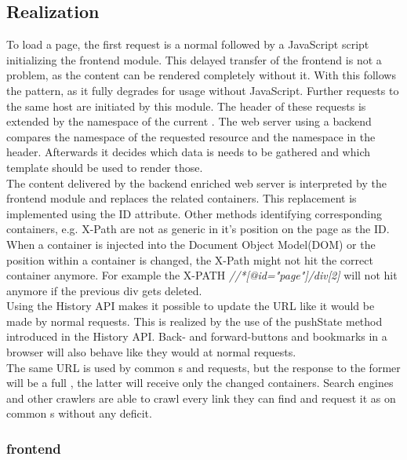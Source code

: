 \subsection{Realization\label{sec:lare_realization}}
To load a page, the first request is a normal \httpRequest{} followed by a JavaScript script initializing the \lare{} frontend module.
This delayed transfer of the frontend is not a problem, as the content can be rendered completely without it.
With this \lare{} follows the \hijax{} pattern, as it fully degrades for usage without JavaScript.
Further requests to the same host are initiated by this module.
The \http{} header of these requests is extended by the namespace of the current \webSite{}.
The web server using a \lare{} backend compares the namespace of the requested resource and the namespace in the \http{} header.
Afterwards it decides which data is needs to be gathered and which template should be used to render those.
\\
The content delivered by the \lare{} backend enriched web server is interpreted by the frontend module and replaces the related containers.
This replacement is implemented using the ID attribute.
Other methods identifying corresponding containers, e.g. X-Path are not as generic in it's position on the page as the ID.
When a container is injected into the Document Object Model(DOM) or the position within a container is changed, the X-Path might not hit the correct container anymore.
For example the X-PATH \emph{//*[@id="page"]/div[2]} will not hit anymore if the previous div gets deleted.
\\
Using the History API makes it possible to update the URL like it would be made by normal requests.
This is realized by the use of the pushState method introduced in the History API.
Back- and forward-buttons and bookmarks in a browser will also behave like they would at normal requests.
\\
The same URL is used by common \httpRequest{}s and \lare{} requests, but the response to the former will be a full \webPage{}, the latter will receive only the changed containers.
Search engines and other crawlers are able to crawl every link they can find and request it as on common \webPage{}s without any deficit.

\subsubsection{\lare{} frontend\label{sec:lare_frontend}}

